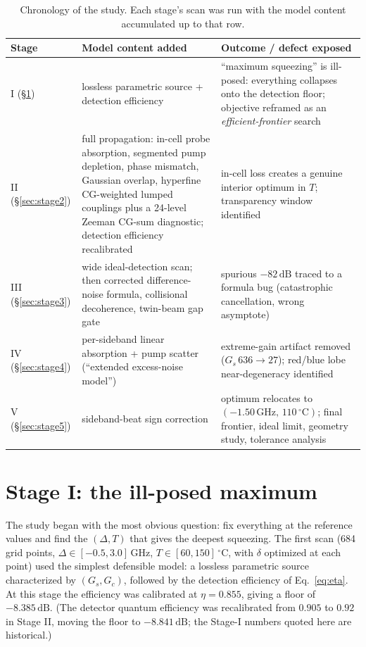 \documentclass[11pt,a4paper]{article}
\newcommand{\dB}{\,\mathrm{dB}}
\newcommand{\GHz}{\,\mathrm{GHz}}
\newcommand{\degC}{\,^{\circ}\mathrm{C}}
\begin{document}
\begin{table}[ht]
\centering
\caption{Chronology of the study. Each stage's scan was run with the model
content accumulated up to that row.}
\label{tab:stages}
\small
\begin{tabularx}{\textwidth}{l>{\raggedright\arraybackslash}X>{\raggedright\arraybackslash}X}
\toprule
Stage & Model content added & Outcome / defect exposed\\
\midrule
I (\S\ref{sec:stage1}) & lossless parametric source + detection efficiency &
``maximum squeezing'' is ill-posed: everything collapses onto the detection
floor; objective reframed as an \emph{efficient-frontier} search\\
II (\S\ref{sec:stage2}) & full propagation: in-cell probe absorption,
segmented pump depletion, phase mismatch, Gaussian overlap, hyperfine
CG-weighted lumped couplings plus a 24-level Zeeman CG-sum diagnostic;
detection efficiency recalibrated &
in-cell loss creates a genuine interior optimum in $T$; transparency window
identified\\
III (\S\ref{sec:stage3}) & wide ideal-detection scan; then corrected
difference-noise formula, collisional decoherence, twin-beam gap gate &
spurious $-82\dB$ traced to a formula bug (catastrophic cancellation, wrong
asymptote)\\
IV (\S\ref{sec:stage4}) & per-sideband linear absorption + pump scatter
(``extended excess-noise model'') &
extreme-gain artifact removed ($G_s\,636\to 27$); red/blue lobe
near-degeneracy identified\\
V (\S\ref{sec:stage5}) & sideband-beat sign correction &
optimum relocates to $(-1.50\GHz,\,110\degC)$; final frontier, ideal limit,
geometry study, tolerance analysis\\
\bottomrule
\end{tabularx}
\end{table}

\section{Stage I: the ill-posed maximum}
\label{sec:stage1}
The study began with the most obvious question: fix everything at the
reference values and find the $(\Delta,T)$ that gives the deepest squeezing.
The first scan (684 grid points, $\Delta\in[-0.5,3.0]\GHz$,
$T\in[60,150]\degC$, with $\delta$ optimized at each point) used the
simplest defensible model: a lossless parametric source characterized by
$(G_s,G_c)$, followed by the detection efficiency of Eq.~\eqref{eq:eta}. At
this stage the efficiency was calibrated at $\eta=0.855$, giving a floor of
$-8.385\dB$. (The detector
quantum efficiency was recalibrated from $0.905$ to $0.92$ in Stage II,
moving the floor to $-8.841\dB$; the Stage-I numbers quoted here are
historical.)
\end{document}
